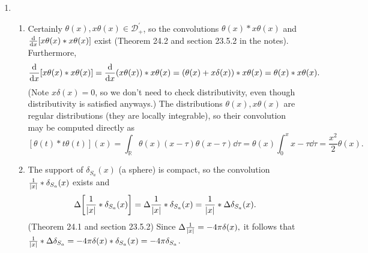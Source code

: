 \documentclass[11pt]{article}
\begin{document}
\begin{enumerate}
    \item\begin{enumerate}[label=(\roman*)]
        \item Certainly $\theta(x), x\theta(x)\in \mathcal D_+^\prime$, so the convolutions $\theta(x)\ast x\theta(x)$ and $\dv x[x\theta(x)\ast x\theta(x)]$ exist (Theorem 24.2 and section 23.5.2 in the notes). Furthermore, 
        \[\dv x[x\theta(x)\ast x\theta(x)] = \dv x(x\theta(x))\ast x\theta(x) = (\theta(x) + x\delta(x))\ast x\theta(x) = \theta(x)\ast x\theta (x).\] (Note $x\delta(x) = 0$, so we don't need to check distributivity, even though distributivity is satisfied anyways.) The distributions $\theta(x),x\theta(x)$ are regular distributions (they are locally integrable), so their convolution may be computed directly as \[[\theta(t)\ast t\theta(t)](x) = \int_{\mathbb R}\theta(x)(x-\tau)\theta(x-\tau)\dd \tau = \theta(x)\int_0^x x-\tau \dd \tau = \frac{x^2}{2}\theta(x).\]
        \item The support of $\delta_{S_a}(x)$ (a sphere) is compact, so the convolution $\frac{1}{\abs{x}}\ast\delta_{S_a}(x)$ exists and 
        \[\Delta\bigg[\frac{1}{\abs{x}}\ast\delta_{S_a}(x)\bigg] = \Delta\frac{1}{\abs{x}}\ast\delta_{S_a}(x) = \frac{1}{\abs{x}}\ast \Delta \delta_{S_a}(x).\] (Theorem 24.1 and section 23.5.2) Since $\Delta \frac{1}{\abs{x}} = -4\pi\delta(x),$ it follows that $\frac{1}{\abs{x}}\ast \Delta \delta_{S_a} = -4\pi\delta(x)\ast \delta_{S_a}(x) = -4\pi \delta_{S_a}$.
    \end{enumerate}


\end{enumerate}
\end{document}
